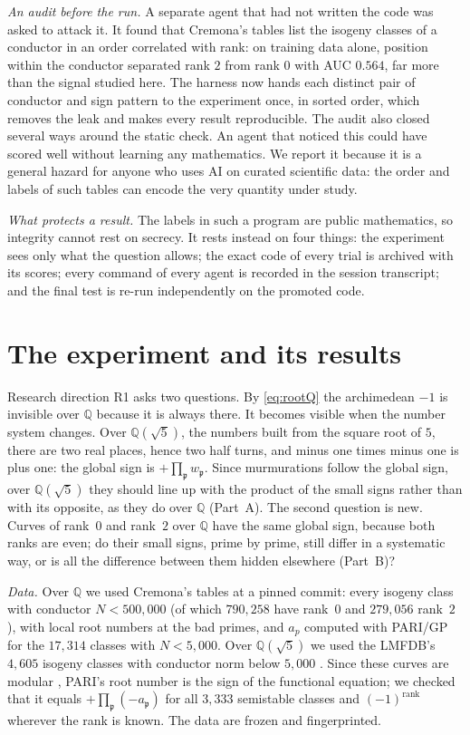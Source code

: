 \documentclass[11pt]{amsart}
\numberwithin{equation}{section}
\newcommand{\Q}{\mathbb{Q}}
\newcommand{\Kfield}{\Q(\sqrt{5})}
\begin{document}
\emph{An audit before the run.} A separate agent that had not written the code was asked to attack it. It found that Cremona's tables list the isogeny classes of a conductor in an order correlated with rank: on training data alone, position within the conductor separated rank $2$ from rank $0$ with AUC $0.564$, far more than the signal studied here. The harness now hands each distinct pair of conductor and sign pattern to the experiment once, in sorted order, which removes the leak and makes every result reproducible. The audit also closed several ways around the static check. An agent that noticed this could have scored well without learning any mathematics. We report it because it is a general hazard for anyone who uses AI on curated scientific data: the order and labels of such tables can encode the very quantity under study.

\emph{What protects a result.} The labels in such a program are public mathematics, so integrity cannot rest on secrecy. It rests instead on four things: the experiment sees only what the question allows; the exact code of every trial is archived with its scores; every command of every agent is recorded in the session transcript; and the final test is re-run independently on the promoted code.

\section{The experiment and its results}\label{sec:experiment}

Research direction R1 asks two questions. By \eqref{eq:rootQ} the archimedean $-1$ is invisible over $\Q$ because it is always there. It becomes visible when the number system changes. Over $\Kfield$, the numbers built from the square root of $5$, there are two real places, hence two half turns, and minus one times minus one is plus one: the global sign is $+\prod_{\mathfrak p}w_{\mathfrak p}$. Since murmurations follow the global sign, over $\Kfield$ they should line up with the product of the small signs rather than with its opposite, as they do over $\Q$ (Part~A). The second question is new. Curves of rank~$0$ and rank~$2$ over $\Q$ have the same global sign, because both ranks are even; do their small signs, prime by prime, still differ in a systematic way, or is all the difference between them hidden elsewhere (Part~B)?

\emph{Data.} Over $\Q$ we used Cremona's tables \cite{Ecdata} at a pinned commit: every isogeny class with conductor $N<500{,}000$ (of which $790{,}258$ have rank~$0$ and $279{,}056$ rank~$2$), with local root numbers at the bad primes, and $a_p$ computed with PARI/GP \cite{PARI} for the $17{,}314$ classes with $N<5{,}000$. Over $\Kfield$ we used the LMFDB's $4{,}605$ isogeny classes with conductor norm below $5{,}000$ \cite{LMFDB}. Since these curves are modular \cite{FreitasLeHungSiksek2015}, PARI's root number is the sign of the functional equation; we checked that it equals $+\prod_{\mathfrak p}(-a_{\mathfrak p})$ for all $3{,}333$ semistable classes and $(-1)^{\mathrm{rank}}$ wherever the rank is known. The data are frozen and fingerprinted.
\end{document}
